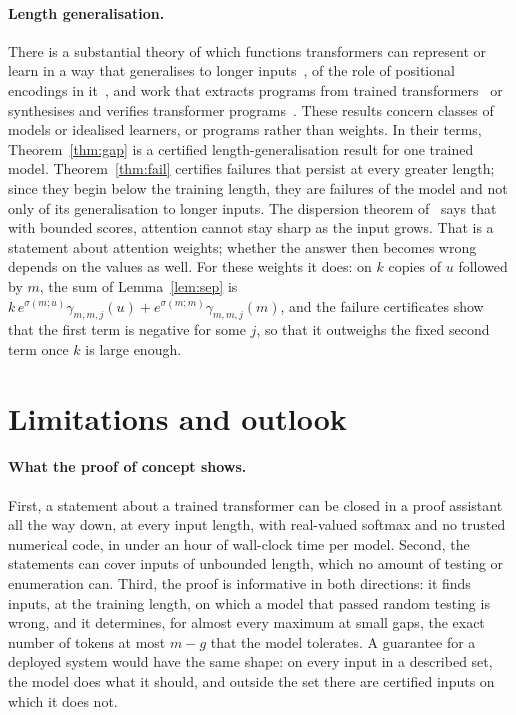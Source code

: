 \documentclass[11pt,a4paper]{article}
\begin{document}
\paragraph{Length generalisation.}
There is a substantial theory of which functions transformers can represent or
learn in a way that generalises to longer
inputs~\cite{hahn2020theoretical,chiang2022overcoming,huang2025formal,yang2026bounds},
of the role of positional encodings in it~\cite{kazemnejad2023nope}, and work
that extracts programs from trained transformers~\cite{huang2026decompiling} or
synthesises and verifies transformer programs~\cite{jiang2026synthesis}. These
results concern classes of models or idealised learners, or programs rather
than weights. In their terms, Theorem~\ref{thm:gap} is a certified
length-generalisation result for one trained model. Theorem~\ref{thm:fail}
certifies failures that persist at every greater length; since they begin
below the training length, they are failures of the model and not only of its
generalisation to longer inputs. The dispersion theorem
of~\cite{velickovic2025softmax} says that with bounded scores, attention cannot
stay sharp as the input grows. That is a statement about attention weights;
whether the answer then becomes wrong depends on the values as well. For these
weights it does: on $k$ copies of $u$ followed by $m$, the sum of
Lemma~\ref{lem:sep} is $k\,e^{\sigma(m;u)}\gamma_{m,m,j}(u)+
e^{\sigma(m;m)}\gamma_{m,m,j}(m)$, and the failure certificates show that the
first term is negative for some $j$, so that it outweighs the fixed second term
once $k$ is large enough.

\section{Limitations and outlook}\label{sec:limits}

\paragraph{What the proof of concept shows.}
First, a statement about a trained transformer can be closed in a proof
assistant all the way down, at every input length, with real-valued softmax and
no trusted numerical code, in under an hour of wall-clock time per model.
Second, the statements can cover inputs of unbounded length, which no amount of
testing or enumeration can. Third, the proof is informative in both directions:
it finds inputs, at the training length, on which a model that passed random
testing is wrong, and it determines, for almost every maximum at small gaps,
the exact number of tokens at most $m-g$ that the model tolerates. A
guarantee for a deployed system would have the same shape: on every input in a
described set, the model does what it should, and outside the set there are
certified inputs on which it does not.
\end{document}
